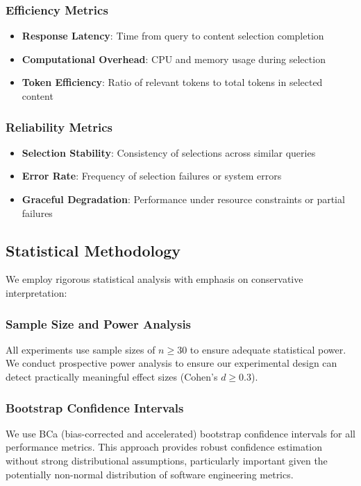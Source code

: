 \documentclass[conference]{IEEEtran}
\begin{document}
\subsubsection{Efficiency Metrics}
\begin{itemize}
\item \textbf{Response Latency}: Time from query to content selection completion
\item \textbf{Computational Overhead}: CPU and memory usage during selection
\item \textbf{Token Efficiency}: Ratio of relevant tokens to total tokens in selected content
\end{itemize}

\subsubsection{Reliability Metrics}
\begin{itemize}
\item \textbf{Selection Stability}: Consistency of selections across similar queries
\item \textbf{Error Rate}: Frequency of selection failures or system errors
\item \textbf{Graceful Degradation}: Performance under resource constraints or partial failures
\end{itemize}

\subsection{Statistical Methodology}

We employ rigorous statistical analysis with emphasis on conservative interpretation:

\subsubsection{Sample Size and Power Analysis}
All experiments use sample sizes of $n \geq 30$ to ensure adequate statistical power. We conduct prospective power analysis to ensure our experimental design can detect practically meaningful effect sizes (Cohen's $d \geq 0.3$).

\subsubsection{Bootstrap Confidence Intervals}
We use BCa (bias-corrected and accelerated) bootstrap confidence intervals for all performance metrics. This approach provides robust confidence estimation without strong distributional assumptions, particularly important given the potentially non-normal distribution of software engineering metrics.
\end{document}
